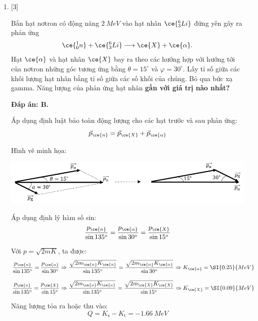 \begin{enumerate}[label=\bfseries Câu \arabic*:]
	\item {} [3]
	\cauhoi
	{Bắn hạt nơtron có động năng $\SI{2}{MeV}$ vào hạt nhân $\ce{^6_3 Li}$ đứng yên gây ra phản ứng
		$$\ce{^1_0 n} + \ce{^6_3 Li} \longrightarrow \ce{X} + \ce{\alpha}.$$
		Hạt $\ce{\alpha}$ và hạt nhân $\ce{X}$ bay ra theo các hướng hợp với hướng tới của nơtron những góc tương ứng bằng $\theta = 15^\circ$ và $\varphi = 30^\circ$. Lấy tỉ số giữa các khối lượng hạt nhân bằng tỉ số giữa các số khối của chúng. Bỏ qua bức xạ gamma. Năng lượng của phản ứng hạt nhân \textbf{gần với giá trị nào nhất?}
	}
	
	\loigiai
	{		\textbf{Đáp án: B.}
		
		Áp dụng định luật bảo toàn động lượng cho các hạt trước và sau phản ứng:
		$$\vec p_{\ce{n}} = \vec p_{\ce{X}} + \vec p_{\ce{\alpha}}$$
		
		Hình vẽ minh họa:
		\begin{center}
			\includegraphics{../figs/VN12-2021-PH-TP037-1}
		\end{center}
		
		Áp dụng định lý hàm số sin:
		$$\dfrac{p_{\ce{n}}}{\sin 135^\circ} = \dfrac{p_{\ce{\alpha}}}{\sin 30^\circ} = \dfrac{p_{\ce{X}}}{\sin 15^\circ}$$
		
		Với $p=\sqrt{2mK}$, ta được:
		$$\dfrac{p_{\ce{n}}}{\sin 135^\circ} = \dfrac{p_{\ce{\alpha}}}{\sin 30^\circ} \Rightarrow \dfrac{\sqrt{2 m_{\ce{n}} K_{\ce{n}}}}{\sin 135^\circ} = \dfrac{\sqrt{2 m_{\ce{\alpha}} K_{\ce{\alpha}}}}{\sin 30^\circ}\Rightarrow K_{\ce{\alpha}} = \SI{0.25}{MeV} $$
		
		$$\dfrac{p_{\ce{n}}}{\sin 135^\circ} = \dfrac{p_{\ce{X}}}{\sin 15^\circ} \Rightarrow \dfrac{\sqrt{2 m_{\ce{n}} K_{\ce{n}}}}{\sin 135^\circ} = \dfrac{\sqrt{2 m_{\ce{X}} K_{\ce{X}}}}{\sin 15^\circ}\Rightarrow K_{\ce{X}} = \SI{0.09}{MeV} $$
		
		Năng lượng tỏa ra hoặc thu vào:
		$$Q=K_{\text{s}} - K_{\text{t}} = \SI{-1.66}{MeV}$$
		
}
\end{enumerate}
